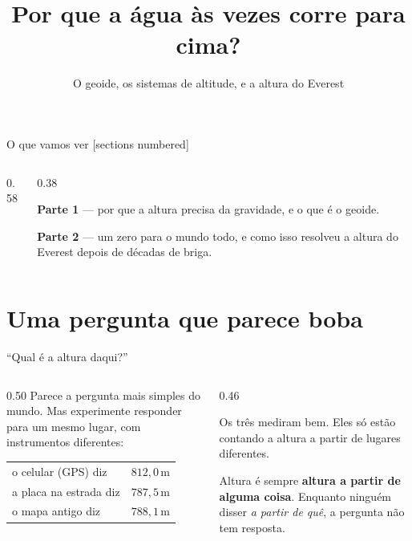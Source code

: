 \documentclass[aspectratio=169,11pt]{beamer}
\title{Por que a água às vezes corre para cima?}
\subtitle{O geoide, os sistemas de altitude, e a altura do Everest}
\author{}
\institute{Simulador de Modelos Terrestres}
\date{}
\newcommand{\bnum}[1]{\textbf{\textcolor{mTeal}{#1}}}
\begin{document}
\maketitle

\begin{frame}{O que vamos ver}
  [sections numbered]
  \begin{columns}[T]
    \begin{column}{0.58\textwidth}
      \tableofcontents
    \end{column}
    \begin{column}{0.38\textwidth}
      \begin{ideia}[title={Duas partes}]
        \small
        \textbf{Parte 1} --- por que a altura precisa da gravidade, e o que é o geoide.
        \medskip

        \textbf{Parte 2} --- um zero para o mundo todo, e como isso resolveu a altura do
        Everest depois de décadas de briga.
      \end{ideia}
    \end{column}
  \end{columns}
\end{frame}

\section{Uma pergunta que parece boba}

\begin{frame}{``Qual é a altura daqui?''}
  \begin{columns}[T]
    \begin{column}{0.50\textwidth}
      Parece a pergunta mais simples do mundo. Mas experimente responder para um mesmo
      lugar, com instrumentos diferentes:
      \bigskip

      \centering
      \small
      \renewcommand{\arraystretch}{1.3}
      \begin{tabular}{lr}
        \toprule
        o celular (GPS) diz & $812{,}0$\,m \\
        a placa na estrada diz & $787{,}5$\,m \\
        o mapa antigo diz & $788{,}1$\,m \\
        \bottomrule
      \end{tabular}
    \end{column}
    \begin{column}{0.46\textwidth}
      \begin{cuidado}[title={Nenhum deles está errado}]
        Os três mediram bem. Eles só estão contando a altura \alert{a partir de lugares
        diferentes}.
      \end{cuidado}
      \bigskip

      Altura é sempre \bnum{altura a partir de alguma coisa}. Enquanto ninguém disser
      \emph{a partir de quê}, a pergunta não tem resposta.
    \end{column}
  \end{columns}
\end{frame}
\end{document}
